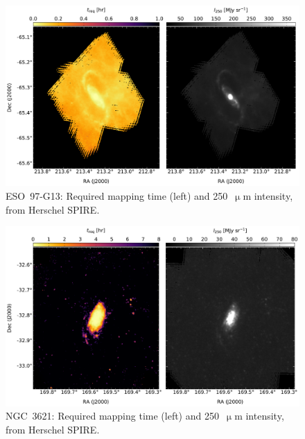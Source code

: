 \begin{figure}[!htbp]
\centering
\includegraphics[width=\textwidth]{figures/galaxies/eso9713}
\caption[~ESO 97-G13 required mapping time.]{ESO~97-G13: Required mapping time (left) and 250~$\upmu$m intensity, from Herschel SPIRE.}
\label{fig:eso9713}
\end{figure}

\begin{figure}[!htbp]
\centering
\includegraphics[width=\textwidth]{figures/galaxies/ngc3621}
\caption[~NGC 3621 required mapping time.]{NGC~3621: Required mapping time (left) and 250~$\upmu$m intensity, from Herschel SPIRE.}
\label{fig:ngc3621}
\end{figure}

